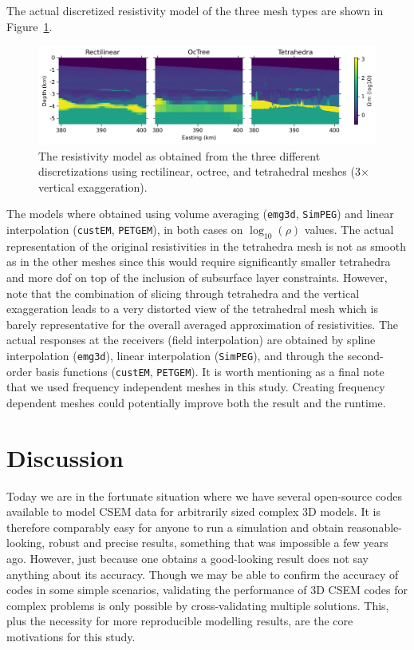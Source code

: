 \documentclass[extra, camera,%
]{gji}
\newlength{\fwidth}
\newcommand{\emg}[2]{\texttt{emg#1#2}\xspace}
\newcommand{\simpeg}{\texttt{SimPEG}\xspace}
\newcommand{\custem}{\texttt{custEM}\xspace}
\newcommand{\petgem}{\texttt{PETGEM}\xspace}
\begin{document}
The actual discretized resistivity model of the three mesh types are shown in Figure~\ref{fig:results-marlim_allmodels}.
%
\begin{figure}
  \centering
  \includegraphics[width=.9\fwidth]{figures/results-marlim_allmodels.png}
  \caption{The resistivity model as obtained from the three different discretizations using rectilinear, octree, and tetrahedral meshes (3$\times$ vertical exaggeration).}
  \label{fig:results-marlim_allmodels}
\end{figure}
%
The models where obtained using volume averaging (\emg3d, \simpeg) and linear interpolation (\custem, \petgem), in both cases on $\log_{10}(\rho)$ values. The actual representation of the original resistivities in the tetrahedra mesh is not as smooth as in the other meshes since this would require significantly smaller tetrahedra and more dof on top of the inclusion of subsurface layer constraints. However, note that the combination of slicing through tetrahedra and the vertical exaggeration leads to a very distorted view of the tetrahedral mesh which is barely representative for the overall averaged approximation of resistivities. The actual responses at the receivers (field interpolation) are obtained by spline interpolation (\emg3d), linear interpolation (\simpeg), and through the second-order basis functions (\custem, \petgem). It is worth mentioning as a final note that we used frequency independent meshes in this study. Creating frequency dependent meshes could potentially improve both the result and the runtime.


\section{Discussion}

Today we are in the fortunate situation where we have several open-source codes available to model CSEM data for arbitrarily sized complex 3D models. It is therefore comparably easy for anyone to run a simulation and obtain reasonable-looking, robust and precise results, something that was impossible a few years ago. However, just because one obtains a good-looking result does not say anything about its accuracy. Though we may be able to confirm the accuracy of codes in some simple scenarios, validating the performance of 3D CSEM codes for complex problems is only possible by cross-validating multiple solutions. This, plus the necessity for more reproducible modelling results, are the core motivations for this study.
\end{document}
